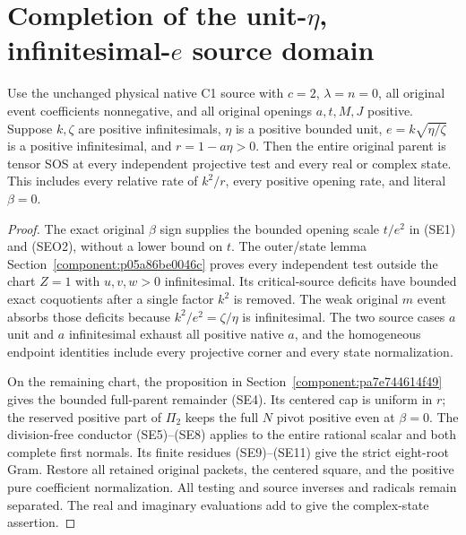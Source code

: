 \section{\texorpdfstring{Completion of the unit-$\eta$, infinitesimal-$e$ source domain}{Completion of the unit-eta, infinitesimal-e source domain}}
\label{component:p29aeda9b68a4}


\begin{theorem}
Use the unchanged physical native C1 source with $c=2$, $\lambda=n=0$,
all original event coefficients nonnegative, and all original openings
$a,t,M,J$ positive. Suppose $k,\zeta$ are positive infinitesimals,
$\eta$ is a positive bounded unit, $e=k\sqrt{\eta/\zeta}$ is a positive
infinitesimal, and $r=1-a\eta>0$. Then the entire original parent is
tensor SOS at every independent projective test and every real or
complex state. This includes every relative rate of $k^2/r$, every
positive opening rate, and literal $\beta=0$.
\end{theorem}

\begin{proof}
The exact original $\beta$ sign supplies the bounded opening scale
$t/e^2$ in (SE1) and (SEO2), without a lower bound on $t$.
The outer/state lemma Section~\ref{component:p05a86be0046c} proves every
independent test outside the chart $Z=1$ with $u,v,w>0$ infinitesimal.
Its critical-source deficits have bounded exact coquotients after a
single factor $k^2$ is removed. The weak original $m$ event absorbs
those deficits because $k^2/e^2=\zeta/\eta$ is infinitesimal.
The two source cases $a$ unit and $a$ infinitesimal exhaust all positive
native $a$, and the homogeneous endpoint identities include every
projective corner and every state normalization.

On the remaining chart, the proposition in
Section~\ref{component:pa7e744614f49} gives the bounded full-parent
remainder (SE4). Its centered cap is uniform in $r$; the reserved
positive part of $\Pi_2$ keeps the full $N$ pivot positive even at
$\beta=0$. The division-free conductor (SE5)--(SE8) applies to the
entire rational scalar and both complete first normals. Its finite
residues (SE9)--(SE11) give the strict eight-root Gram. Restore all
retained original packets, the centered square, and the positive pure
coefficient normalization. All testing and source inverses and radicals
remain separated. The real and imaginary evaluations add to give the
complex-state assertion.
\end{proof}

